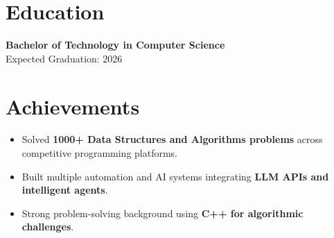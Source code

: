 \documentclass[a4paper,9pt]{article}
\begin{document}
\section*{Education}

\textbf{Bachelor of Technology in Computer Science} \\
Expected Graduation: 2026

\section*{Achievements}

\begin{itemize}[leftmargin=12pt, itemsep=1pt]
\item Solved \textbf{1000+ Data Structures and Algorithms problems} across competitive programming platforms.
\item Built multiple automation and AI systems integrating \textbf{LLM APIs and intelligent agents}.
\item Strong problem-solving background using \textbf{C++ for algorithmic challenges}.
\end{itemize}
\end{document}
